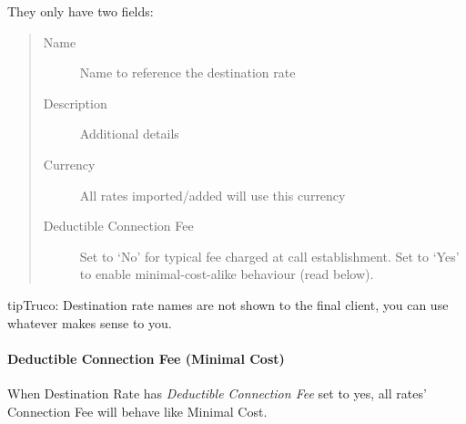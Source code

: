 \documentclass[letterpaper,10pt,spanish]{sphinxmanual}
\begin{document}
They only have two fields:
\begin{quote}
\begin{description}
\item[{Name}] \leavevmode
Name to reference the destination rate

\item[{Description}] \leavevmode
Additional details

\item[{Currency}] \leavevmode
All rates imported/added will use this currency

\item[{Deductible Connection Fee}] \leavevmode
Set to `No' for typical fee charged at call establishment. Set to `Yes' to enable
minimal-cost-alike behaviour (read below).

\end{description}
\end{quote}

\begin{notice}{tip}{Truco:}
Destination rate names are not shown to the final client, you can use whatever makes sense to you.
\end{notice}


\paragraph{Deductible Connection Fee (Minimal Cost)}
\label{administration_portal/brand/billing/destination_rates:deductible-connection-fee-minimal-cost}
When Destination Rate has \emph{Deductible Connection Fee} set to yes, all rates' Connection Fee will behave like Minimal Cost.
\end{document}
